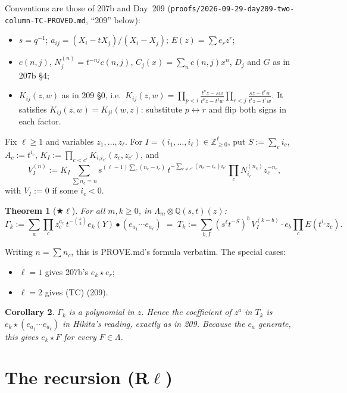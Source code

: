 \documentclass[11pt]{amsart}
\newtheorem{theorem}{Theorem}
\newtheorem{corollary}[theorem]{Corollary}
\theoremstyle{remark}
\begin{document}
Conventions are those of 207b and Day~209 ({\footnotesize\texttt{proofs/2026-09-29-day209-two-column-TC-PROVED.md}}, ``209'' below):
\begin{itemize}
\item $s=q^{-1}$; $a_{ij}=(X_i-tX_j)/(X_i-X_j)$; $E(z)=\sum e_rz^r$;
\item $c(n,j)$, $N^{(n)}_j=t^{-nj}c(n,j)$, $C_j(x)=\sum_nc(n,j)x^n$, $D_j$ and $G$ as in 207b \S4;
\item $K_{ij}(z,w)$ as in 209 \S0, i.e.\ $K_{ij}(z,w)=\prod_{p<i}\frac{t^pz-sw}{t^pz-t^jw}\prod_{r<j}\frac{sz-t^rw}{t^iz-t^rw}$. It satisfies $K_{ij}(z,w)=K_{ji}(w,z)$: substitute $p\leftrightarrow r$ and flip both signs in each factor.
\end{itemize}

Fix $\ell\ge1$ and variables $z_1,\dots,z_\ell$. For $I=(i_1,\dots,i_\ell)\in\mathbb{Z}^\ell_{\ge0}$, put $S:=\sum_ci_c$, $A_c:=t^{i_c}$, $K_I:=\prod_{c<c'}K_{i_ci_{c'}}(z_c,z_{c'})$, and
\[
V^{(n)}_I:=K_I\sum_{\sum n_c=n}s^{(\ell-1)\sum_c(n_c-i_c)}\,t^{-\sum_{c\ne c'}(n_c-i_c)i_{c'}}\prod_cN^{(n_c)}_{i_c}z_c^{-n_c},
\]
with $V_I:=0$ if some $i_c<0$.

\begin{theorem}[$\bigstar\ell$]\label{thm:main}
For all $m,k\ge0$, in $\Lambda_m\otimes\mathbb{Q}(s,t)(z)$:
\[
\Gamma_k:=\sum_a\prod_cz_c^{a_c}\,t^{-\binom k2}e_k(Y)\bullet(e_{a_1}\cdots e_{a_\ell})
\;=\;T_k:=\sum_{b,I}(s^\ell t^{-S})^b\,V^{(k-b)}_I\cdot e_b\prod_cE(t^{i_c}z_c).
\]
\end{theorem}
Writing $n=\sum n_c$, this is PROVE.md's formula verbatim. The special cases:
\begin{itemize}
\item $\ell=1$ gives 207b's $e_k\star e_r$;
\item $\ell=2$ gives (TC) (209).
\end{itemize}

\begin{corollary}
$\Gamma_k$ is a polynomial in $z$. Hence the coefficient of $z^a$ in $T_k$ is $e_k\star(e_{a_1}\cdots e_{a_\ell})$ in Hikita's reading, exactly as in 209. Because the $e_a$ generate, this gives $e_k\star F$ for every $F\in\Lambda$.
\end{corollary}

\section{The recursion (R\texorpdfstring{$\ell$}{l})}\label{sec:R}
\end{document}
